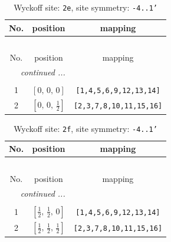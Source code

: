 \documentclass[fleqn,8pt]{jsarticle}
\begin{document}
\begin{longtable}{ccc}
\caption{Wyckoff site: {\tt 2e}, site symmetry: {\tt -4..1'}}
 \\
 \hline \hline
No. & position & mapping \\ \hline \endfirsthead

\multicolumn{2}{l}{\tablename\ \thetable{}} \\
 \hline \hline
No. & position & mapping \\ \hline \endhead

 \hline \hline
\multicolumn{2}{r}{\footnotesize\it continued ...} \\ \endfoot

 \hline \hline
\multicolumn{2}{r}{} \\ \endlastfoot

1 & $\left[ 0,\, 0,\, 0 \right]$ & {\tt [1,4,5,6,9,12,13,14]} \\ \hline
2 & $\left[ 0,\, 0,\, \frac{1}{2} \right]$ & {\tt [2,3,7,8,10,11,15,16]} \\
\end{longtable}
\renewcommand{\arraystretch}{1.2}
\begin{longtable}{ccc}
\caption{Wyckoff site: {\tt 2f}, site symmetry: {\tt -4..1'}}
 \\
 \hline \hline
No. & position & mapping \\ \hline \endfirsthead

\multicolumn{2}{l}{\tablename\ \thetable{}} \\
 \hline \hline
No. & position & mapping \\ \hline \endhead

 \hline \hline
\multicolumn{2}{r}{\footnotesize\it continued ...} \\ \endfoot

 \hline \hline
\multicolumn{2}{r}{} \\ \endlastfoot

1 & $\left[ \frac{1}{2},\, \frac{1}{2},\, 0 \right]$ & {\tt [1,4,5,6,9,12,13,14]} \\ \hline
2 & $\left[ \frac{1}{2},\, \frac{1}{2},\, \frac{1}{2} \right]$ & {\tt [2,3,7,8,10,11,15,16]} \\
\end{longtable}
\renewcommand{\arraystretch}{1.2}
\end{document}
